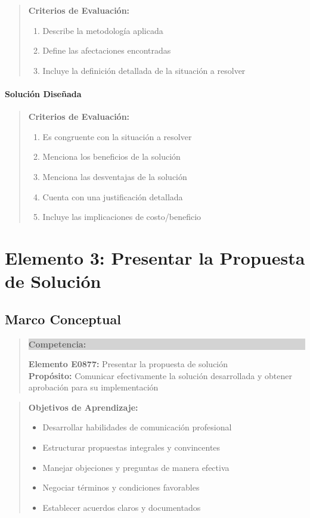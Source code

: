 \documentclass[12pt,letterpaper,oneside]{book}
\newenvironment{objetivos}
{\begin{quote}\color{textgray}\textbf{Objetivos de Aprendizaje:}\begin{itemize}}
{\end{itemize}\end{quote}}
\newenvironment{competencia}
{\begin{quote}\colorbox{lightgray}{\parbox{\dimexpr\linewidth-2\fboxsep}{\textbf{Competencia:}\ }}}
{\end{quote}}
\newenvironment{criterios}
{\begin{quote}\textbf{Criterios de Evaluación:}\begin{enumerate}}
{\end{enumerate}\end{quote}}
\begin{document}
\begin{criterios}
\item Describe la metodología aplicada
\item Define las afectaciones encontradas
\item Incluye la definición detallada de la situación a resolver
\end{criterios}

\subsubsection{Solución Diseñada}

\begin{criterios}
\item Es congruente con la situación a resolver
\item Menciona los beneficios de la solución
\item Menciona las desventajas de la solución
\item Cuenta con una justificación detallada
\item Incluye las implicaciones de costo/beneficio
\end{criterios}

\chapter{Elemento 3: Presentar la Propuesta de Solución}

\section{Marco Conceptual}

\begin{competencia}
\textbf{Elemento E0877:} Presentar la propuesta de solución\\
\textbf{Propósito:} Comunicar efectivamente la solución desarrollada y obtener aprobación para su implementación
\end{competencia}

\begin{objetivos}
\item Desarrollar habilidades de comunicación profesional
\item Estructurar propuestas integrales y convincentes
\item Manejar objeciones y preguntas de manera efectiva
\item Negociar términos y condiciones favorables
\item Establecer acuerdos claros y documentados
\end{objetivos}
\end{document}
